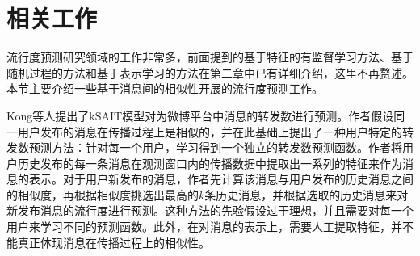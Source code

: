 \section{相关工作}
流行度预测研究领域的工作非常多，前面提到的基于特征的有监督学习方法、基于随机过程的方法和基于表示学习的方法在第二章中已有详细介绍，这里不再赘述。本节主要介绍一些基于消息间的相似性开展的流行度预测工作。

Kong等人\citep{kong2014predicting}提出了kSAIT模型对为微博平台中消息的转发数进行预测。作者假设同一用户发布的消息在传播过程上是相似的，并在此基础上提出了一种用户特定的转发数预测方法：针对每一个用户，学习得到一个独立的转发数预测函数。作者将用户历史发布的每一条消息在观测窗口内的传播数据中提取出一系列的特征来作为消息的表示。对于用户新发布的消息，作者先计算该消息与用户发布的历史消息之间的相似度，再根据相似度挑选出最高的$k$条历史消息，并根据选取的历史消息来对新发布消息的流行度进行预测。这种方法的先验假设过于理想，并且需要对每一个用户来学习不同的预测函数。此外，在对消息的表示上，需要人工提取特征，并不能真正体现消息在传播过程上的相似性。

